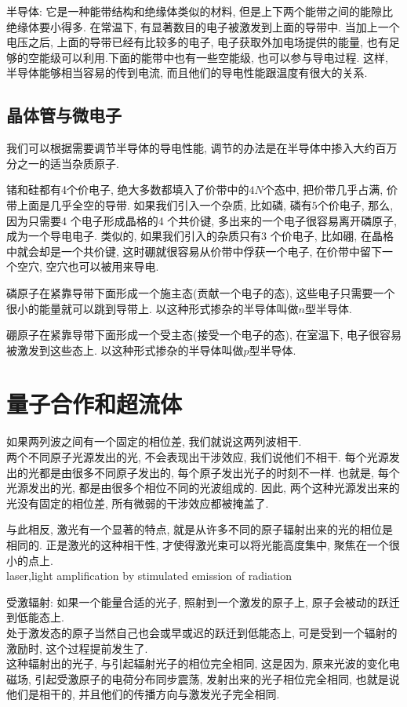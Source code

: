 \documentclass[openany]{book}
\begin{document}
半导体: 它是一种能带结构和绝缘体类似的材料, 但是上下两个能带之间的能隙比绝缘体要小得多. 在常温下, 有显著数目的电子被激发到上面的导带中. 
当加上一个电压之后, 上面的导带已经有比较多的电子, 电子获取外加电场提供的能量, 也有足够的空能级可以利用.下面的能带中也有一些空能级, 也可以参与导电过程. 
这样, 半导体能够相当容易的传到电流, 而且他们的导电性能跟温度有很大的关系.

\subsection{晶体管与微电子}
我们可以根据需要调节半导体的导电性能, 调节的办法是在半导体中掺入大约百万分之一的适当杂质原子.

锗和硅都有4个价电子, 绝大多数都填入了价带中的$4N$个态中, 把价带几乎占满, 价带上面是几乎全空的导带. 
如果我们引入一个杂质, 比如磷, 磷有$5$个价电子, 那么, 因为只需要4 个电子形成晶格的4 个共价键, 多出来的一个电子很容易离开磷原子, 成为一个导电电子. 
类似的, 如果我们引入的杂质只有3 个价电子, 比如硼, 在晶格中就会却是一个共价键, 这时硼就很容易从价带中俘获一个电子, 在价带中留下一个空穴, 空穴也可以被用来导电.

磷原子在紧靠导带下面形成一个施主态(贡献一个电子的态), 这些电子只需要一个很小的能量就可以跳到导带上. 以这种形式掺杂的半导体叫做$n$型半导体.\par
硼原子在紧靠导带下面形成一个受主态(接受一个电子的态), 在室温下, 电子很容易被激发到这些态上. 以这种形式掺杂的半导体叫做$p$型半导体.

\section{量子合作和超流体}
如果两列波之间有一个固定的相位差, 我们就说这两列波相干.\\
两个不同原子光源发出的光, 不会表现出干涉效应, 我们说他们不相干. 每个光源发出的光都是由很多不同原子发出的, 每个原子发出光子的时刻不一样. 
也就是, 每个光源发出的光, 都是由很多个相位不同的光波组成的. 因此, 两个这种光源发出来的光没有固定的相位差, 所有微弱的干涉效应都被掩盖了.

与此相反, 激光有一个显著的特点, 就是从许多不同的原子辐射出来的光的相位是相同的. 正是激光的这种相干性, 才使得激光束可以将光能高度集中, 聚焦在一个很小的点上.\\
laser,light amplification by stimulated emission of radiation

受激辐射: 如果一个能量合适的光子, 照射到一个激发的原子上, 原子会被动的跃迁到低能态上.\\
处于激发态的原子当然自己也会或早或迟的跃迁到低能态上, 可是受到一个辐射的激励时, 这个过程提前发生了.\\
这种辐射出的光子, 与引起辐射光子的相位完全相同, 
这是因为, 原来光波的变化电磁场, 引起受激原子的电荷分布同步震荡, 发射出来的光子相位完全相同, 也就是说他们是相干的, 并且他们的传播方向与激发光子完全相同.
\end{document}
